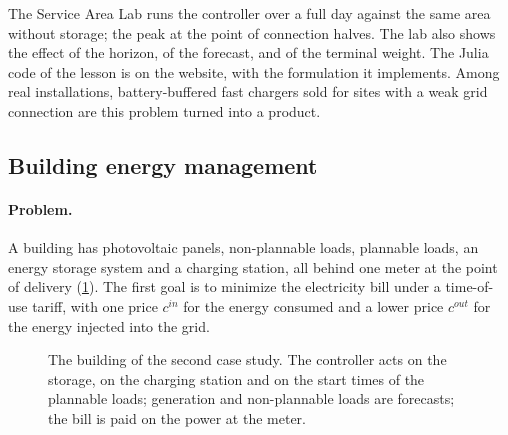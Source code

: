 \begin{labbox}
The Service Area Lab runs the controller over a full day against the same area without storage;
the peak at the point of connection halves. The lab also shows the effect of the horizon, of the
forecast, and of the terminal weight. The Julia code of the lesson is on the website, with the
formulation it implements. Among real installations, battery-buffered fast chargers sold for
sites with a weak grid connection are this problem turned into a product.
\end{labbox}

\subsection{Building energy management}
\label{sec:building}

\paragraph{Problem.} A building has photovoltaic panels, non-plannable loads, plannable loads,
an energy storage system and a charging station, all behind one meter at the point of delivery
(\cref{fig:building}). The first goal is to minimize the electricity bill under a time-of-use
tariff, with one price $c^{in}$ for the energy consumed and a lower price $c^{out}$ for the
energy injected into the grid.

\begin{figure}[t]
\centering
{}
\caption{The building of the second case study. The controller acts on the storage, on the
charging station and on the start times of the plannable loads; generation and non-plannable
loads are forecasts; the bill is paid on the power at the meter.}
\label{fig:building}
\end{figure}

